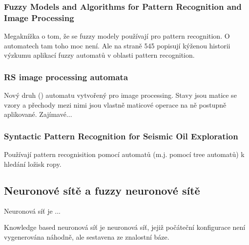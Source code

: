 \documentclass[a4paper,10pt]{article}
\begin{document}
\subsubsection*{Fuzzy Models and Algorithms for Pattern Recognition and Image Processing \cite{BezKelKriPal-FuzzModAlgPattRecImaProc}}
Megaknížka o tom, že se fuzzy modely používají pro pattern recognition. O automatech tam toho moc není. Ale na straně 545 popisují kýženou historii výzkumu aplikací fuzzy automatů v oblasti pattern recognition.

\subsubsection*{RS image processing automata \cite{Xia-RSImaProcAut}}
Nový druh () automatu vytvořený pro image processing. Stavy jsou matice se vzory a přechody mezi nimi jsou vlastně maticové operace na ně postupně aplikované. Zajímavé...

\subsubsection*{Syntactic Pattern Recognition for Seismic Oil Exploration \cite{Hua-SyntPattRecSeisOilExp}}
Používají pattern recognisition pomocí automatů (m.j. pomocí tree automatů) k hledání ložisk ropy.


\subsection{Neuronové sítě a fuzzy neuronové sítě}

\begin{definition}
Neuronová síť je ... 
\end{definition}

\begin{definition}
Knowledge based neuronová síť  je neuronová síť, jejiž počáteční konfigurace není vygenerována náhodně, ale sestavena ze znalostní báze.
\end{definition}

\begin{definition}
\end{definition}
\end{document}
